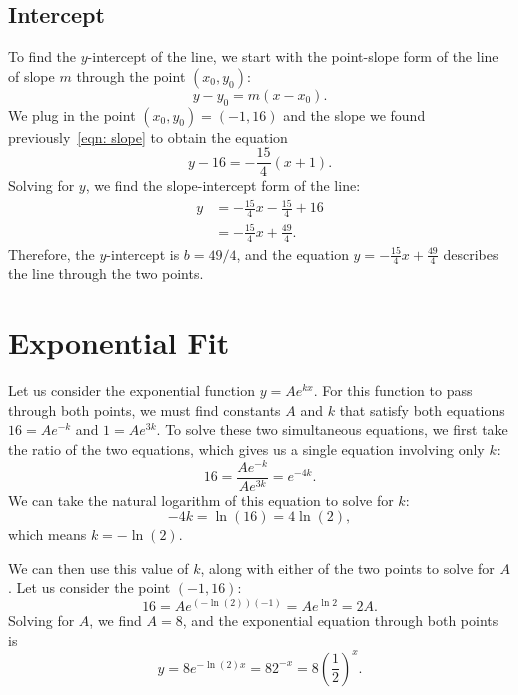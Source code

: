 \documentclass[11pt]{article}         %
\begin{document}
\subsection{Intercept}
\label{sec: intercept}

To find the $y$-intercept of the line, we start with the point-slope form of
the line of slope $m$ through the point $(x_0, y_0)$:
$$
	y - y_0 = m (x - x_0)
	.
$$
We plug in the point $(x_0, y_0) = (-1, 16)$ and the slope we found
previously~\eqref{eqn: slope} to obtain the equation
$$
	y - 16 = - \frac{15}{4} (x + 1)
	.
$$
Solving for $y$, we find the slope-intercept form of the line:
\begin{align*}
	y 
	&= - \frac{15}{4} x - \frac{15}{4} + 16 \\
	&= - \frac{15}{4} x + \frac{49}{4}
	.
\end{align*}
Therefore, the $y$-intercept is $b = 49/4$, and the equation 
$y = - \frac{15}{4} x + \frac{49}{4}$ describes the line through the two
points.

\section{Exponential Fit}
\label{sec: exponential fit}

Let us consider the exponential function $y = A e^{k x}$.  For this function
to pass through both points, we must find constants $A$ and $k$ that satisfy
both equations $16 = A e^{-k}$ and $1 = A e^{3 k}$.  To solve these two
simultaneous equations, we first take the ratio of the two equations, which
gives us a single equation involving only $k$:
$$
	16
	= \frac{A e^{-k}}{A e^{3 k}}
	= e^{-4 k}
	.
$$
We can take the natural logarithm of this equation to solve for $k$:
$$
	-4k = \ln(16) = 4 \ln (2)
	,
$$
which means $k = - \ln(2)$.

We can then use this value of $k$, along with either of the two points to
solve for $A$.  Let us consider the point $(-1, 16)$:
$$
	16 = A e^{(-\ln(2))(-1)} = A e^{\ln{2}} = 2 A
	.
$$
Solving for $A$, we find $A = 8$, and the exponential equation through both
points is
$$
	y
	= 8 e^{-\ln(2) x}
	= 8 2^{-x}
	= 8 \left( \frac{1}{2} \right)^x
	.
$$
\listoftodos
\end{document}
